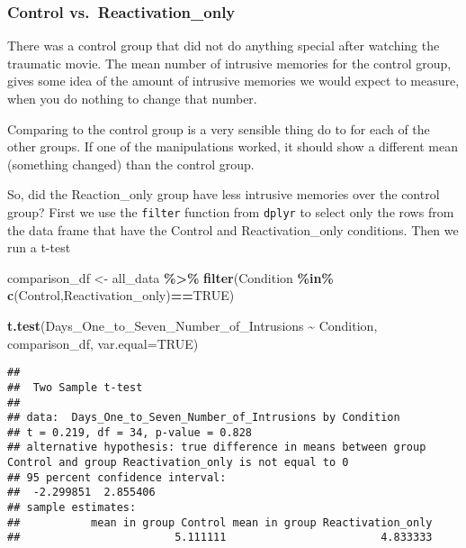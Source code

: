 \documentclass[
]{book}
\newenvironment{Shaded}{\begin{snugshade}}{\end{snugshade}}
\newcommand{\AttributeTok}[1]{\textcolor[rgb]{0.13,0.29,0.53}{#1}}
\newcommand{\ConstantTok}[1]{\textcolor[rgb]{0.56,0.35,0.01}{#1}}
\newcommand{\FunctionTok}[1]{\textcolor[rgb]{0.13,0.29,0.53}{\textbf{#1}}}
\newcommand{\NormalTok}[1]{#1}
\newcommand{\OtherTok}[1]{\textcolor[rgb]{0.56,0.35,0.01}{#1}}
\newcommand{\SpecialCharTok}[1]{\textcolor[rgb]{0.81,0.36,0.00}{\textbf{#1}}}
\newcommand{\StringTok}[1]{\textcolor[rgb]{0.31,0.60,0.02}{#1}}
\begin{document}
\hypertarget{control-vs.-reactivation_only}{%
\subsubsection{Control vs.~Reactivation\_only}\label{control-vs.-reactivation_only}}

There was a control group that did not do anything special after watching the traumatic movie. The mean number of intrusive memories for the control group, gives some idea of the amount of intrusive memories we would expect to measure, when you do nothing to change that number.

Comparing to the control group is a very sensible thing do to for each of the other groups. If one of the manipulations worked, it should show a different mean (something changed) than the control group.

So, did the Reaction\_only group have less intrusive memories over the control group? First we use the \texttt{filter} function from \texttt{dplyr} to select only the rows from the data frame that have the Control and Reactivation\_only conditions. Then we run a t-test

\begin{Shaded}
\begin{Highlighting}[]
\NormalTok{comparison\_df }\OtherTok{\textless{}{-}}\NormalTok{ all\_data }\SpecialCharTok{\%\textgreater{}\%} 
                  \FunctionTok{filter}\NormalTok{(Condition }\SpecialCharTok{\%in\%} \FunctionTok{c}\NormalTok{(}\StringTok{\textquotesingle{}Control\textquotesingle{}}\NormalTok{,}\StringTok{\textquotesingle{}Reactivation\_only\textquotesingle{}}\NormalTok{)}\SpecialCharTok{==}\ConstantTok{TRUE}\NormalTok{)}
                        
\FunctionTok{t.test}\NormalTok{(Days\_One\_to\_Seven\_Number\_of\_Intrusions }\SpecialCharTok{\textasciitilde{}}\NormalTok{ Condition, }
\NormalTok{       comparison\_df,}
       \AttributeTok{var.equal=}\ConstantTok{TRUE}\NormalTok{)}
\end{Highlighting}
\end{Shaded}

\begin{verbatim}
## 
##  Two Sample t-test
## 
## data:  Days_One_to_Seven_Number_of_Intrusions by Condition
## t = 0.219, df = 34, p-value = 0.828
## alternative hypothesis: true difference in means between group Control and group Reactivation_only is not equal to 0
## 95 percent confidence interval:
##  -2.299851  2.855406
## sample estimates:
##           mean in group Control mean in group Reactivation_only 
##                        5.111111                        4.833333
\end{verbatim}
\end{document}
